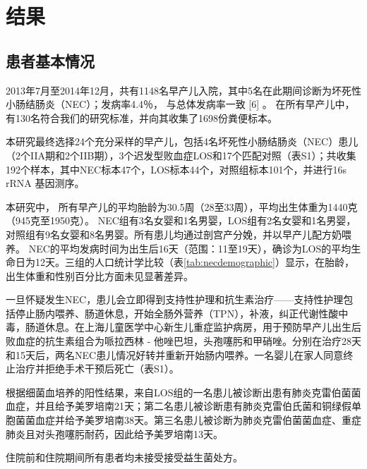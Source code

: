 \section{结果}
  \subsection{患者基本情况}
  2013年7月至2014年12月，共有1148名早产儿入院，其中5名在此期间诊断为坏死性小肠结肠炎（NEC）；发病率4.4％， 与总体发病率一致 [6] 。 在所有早产儿中，有130名符合我们的研究标准，并向其收集了1698份粪便标本。

  本研究最终选择24个充分采样的早产儿，包括4名坏死性小肠结肠炎（NEC）患儿（2个IIA期和2个IIB期），3个迟发型败血症LOS和17个匹配对照（表S1）；共收集192个样本，其中NEC标本47个，LOS标本44个，对照组标本101个，并进行16s rRNA 基因测序。

  本研究中， 所有早产儿的平均胎龄为30.5周（28至33周），平均出生体重为1440克（945克至1950克）。 NEC组有3名女婴和1名男婴，LOS组有2名女婴和1名男婴，对照组有9名女婴和8名男婴。所有患儿均通过剖宫产分娩，并以早产儿配方奶喂养。 NEC的平均发病时间为出生后16天（范围：11至19天），确诊为LOS的平均生命日为12天。三组的人口统计学比较（表\ref{tab:necdemographic}）显示，在胎龄，出生体重和性别百分比方面未见显著差异。

  一旦怀疑发生NEC，患儿会立即得到支持性护理和抗生素治疗——支持性护理包括停止肠内喂养、肠道休息，开始全肠外营养（TPN），补液，纠正代谢性酸中毒，肠道休息。在上海儿童医学中心新生儿重症监护病房，用于预防早产儿出生后败血症的抗生素组合为哌拉西林 - 他唑巴坦，头孢噻肟和甲硝唑。分别在治疗28天和15天后，两名NEC患儿情况好转并重新开始肠内喂养。一名婴儿在家人同意终止治疗并拒绝手术干预后死亡（表S1）。

  根据细菌血培养的阳性结果，来自LOS组的一名患儿被诊断出患有肺炎克雷伯菌菌血症，并且给予美罗培南21天；第二名患儿被诊断患有肺炎克雷伯氏菌和铜绿假单胞菌菌血症并给予美罗培南38天。第三名患儿被诊断为肺炎克雷伯菌菌血症、重症肺炎且对头孢噻肟耐药，因此给予美罗培南13天。

  住院前和住院期间所有患者均未接受接受益生菌处方。


